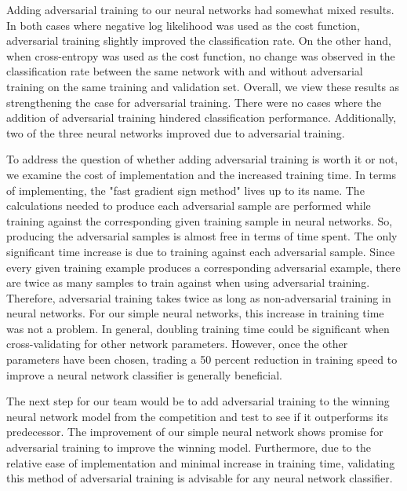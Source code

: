 \documentclass{article} %
\begin{document}
Adding adversarial training to our neural networks had somewhat mixed results. In both cases where negative log likelihood was used as the cost function, adversarial training slightly improved the classification rate. On the other hand, when cross-entropy was used as the cost function, no change was observed in the classification rate between the same network with and without adversarial training on the same training and validation set. Overall, we view these results as strengthening the case for adversarial training. There were no cases where the addition of adversarial training hindered classification performance. Additionally, two of the three neural networks improved due to adversarial training.

To address the question of whether adding adversarial training is worth it or not, we examine the cost of implementation and the increased training time. In terms of implementing, the "fast gradient sign method" lives up to its name. The calculations needed to produce each adversarial sample are performed while training against the corresponding given training sample in neural networks. So, producing the adversarial samples is almost free in terms of time spent. The only significant time increase is due to training against each adversarial sample. Since every given training example produces a corresponding adversarial example, there are twice as many samples to train against when using adversarial training. Therefore, adversarial training takes twice as long as non-adversarial training in neural networks. For our simple neural networks, this increase in training time was not a problem. In general, doubling training time could be significant when cross-validating for other network parameters. However, once the other parameters have been chosen, trading a 50 percent reduction in training speed to improve a neural network classifier is generally beneficial.

The next step for our team would be to add adversarial training to the winning neural network model from the competition and test to see if it outperforms its predecessor. The improvement of our simple neural network shows promise for adversarial training to improve the winning model. Furthermore, due to the relative ease of implementation and minimal increase in training time, validating this method of adversarial training is advisable for any neural network classifier.

\end{document}
